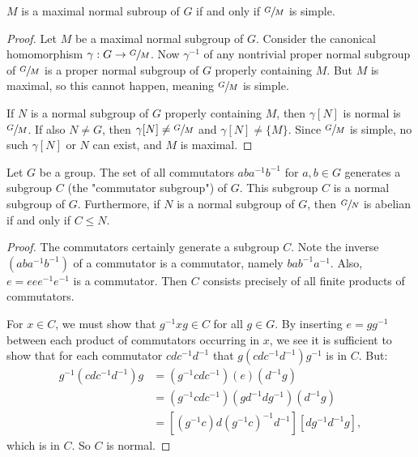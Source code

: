 \documentclass[a4paper,11pt]{article}
\begin{document}
\begin{outline}
    \(M\) is a maximal normal subroup of \(G\) if and only if \(\sfrac{G}{M}\) is simple.
    
    \begin{proof}
      \forward 
        Let \(M\) be a maximal normal subgroup of \(G\). Consider the canonical homomorphism
        \(\gamma: G \rightarrow \sfrac{G}{M}\). Now \(\gamma^{-1}\) of any nontrivial proper normal 
        subgroup of \(\sfrac{G}{M}\) is a proper normal subgroup of \(G\) properly containing \(M\). 
        But \(M\) is maximal, so this cannot happen, meaning \(\sfrac{G}{M}\) is simple.
        
      \backward
        If \(N\) is a normal subgroup of \(G\) properly containing \(M\), then \(\gamma[N]\) is normal is 
        \(\sfrac{G}{M}\). If also \(N \neq G\), then \(\gamma[N] \neq \sfrac{G}{M}\) and \(\gamma[N] \neq
        \{M\}\). Since \(\sfrac{G}{M}\) is simple, no such \(\gamma[N]\) or \(N\) can exist, and \(M\) is maximal.
    \end{proof}
    
    Let \(G\) be a group. The set of all commutators \(aba^{-1}b^{-1}\) for \(a, b \in G\)
    generates a subgroup \(C\) (the "commutator subgroup") of \(G\). This subgroup \(C\) is a normal subgroup of
    \(G\). Furthermore, if \(N\) is a normal subgroup of \(G\), then \(\sfrac{G}{N}\) is abelian if and only if
    \(C \leq N\).
    
    \begin{proof}
      The commutators certainly generate a subgroup \(C\). Note the inverse \((aba^{-1}b^{-1})\) of a commutator is 
      a commutator, namely \(bab^{-1}a^{-1}\). Also, \(e = eee^{-1}e^{-1}\) is a commutator. Then \(C\) consists 
      precisely of all finite products of commutators. 
      
      For \(x \in C\), we must show that \(g^{-1}xg \in C\) for all \(g \in G\). By
      inserting \(e = gg^{-1}\) between each product of commutators occurring in \(x\), we see it is sufficient to show 
      that for each commutator \(cdc^{-1}d^{-1}\) that \(g(cdc^{-1}d^{-1})g^{-1}\) is in \(C\). But:
      \begin{align*}
        g^{-1}(cdc^{-1}d^{-1})g &= (g^{-1}cdc^{-1})(e)(d^{-1}g) \\
                                &= (g^{-1}cdc^{-1})(gd^{-1}dg^{-1})(d^{-1}g)\\
                                &= [(g^{-1}c)d(g^{-1}c)^{-1}d^{-1}][dg^{-1}d^{-1}g],
      \end{align*}
      which is in \(C\). So \(C\) is normal. 
      

\end{proof}
\end{outline}
\end{document}
